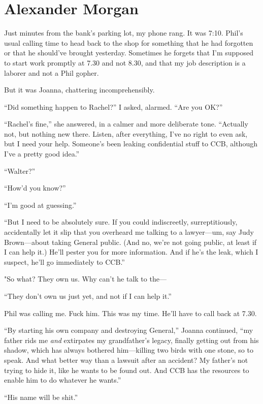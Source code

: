 \chapter{Alexander Morgan}

\titlemark

Just minutes from the bank's parking lot, my phone rang. It was 7:10.
Phil's usual calling time to head back to the shop for something that he
had forgotten or that he should've brought yesterday. Sometimes he
forgets that I'm supposed to start work promptly at 7.30 and not 8.30,
and that my job description is a laborer and not a Phil gopher.

But it was Joanna, chattering incomprehensibly.

``Did something happen to Rachel?'' I asked, alarmed. ``Are you OK?''

``Rachel's fine,'' she answered, in a calmer and more deliberate tone.
``Actually not, but nothing new there. Listen, after everything, I've no
right to even ask, but I need your help. Someone's been leaking
confidential stuff to CCB, although I've a pretty good idea.''

``Walter?''

``How'd you know?''

``I'm good at guessing.''

``But I need to be absolutely sure. If you could indiscreetly,
surreptitiously, accidentally let it slip that you overheard me talking
to a lawyer---um, say Judy Brown---about taking General public. (And no,
we're not going public, at least if I can help it.) He'll pester you for
more information. And if he's the leak, which I suspect, he'll go
immediately to CCB.''

"So what? They own us. Why can't he talk to the---

``They don't own us just yet, and not if I can help it.''

Phil was calling me. Fuck him. This was my time. He'll have to call back
at 7.30.

``By starting his own company and destroying General,'' Joanna
continued, ``my father rids me \emph{and} extirpates my grandfather's
legacy, finally getting out from his shadow, which has always bothered
him---killing two birds with one stone, so to speak. And what better way
than a lawsuit after an accident? My father's not trying to hide it,
like he wants to be found out. And CCB has the resources to enable him
to do whatever he wants.''

``His name will be shit.''

